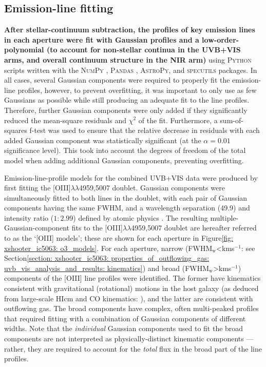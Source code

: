\newpage
\subsection{Emission-line fitting}
\label{section: xshooter_ic_5063: observations_and_data_reduction: emission_line_fitting}

\textbf{After stellar-continuum subtraction, the profiles of key emission lines in each aperture were fit with Gaussian profiles and a low-order-polynomial (to account for non-stellar continua in the UVB+VIS arms, and overall continuum structure in the NIR arm)} using \textsc{Python} scripts written with the \textsc{NumPy} \citep{Harris2020}, \textsc{Pandas} \citep{reback2020pandas}, \textsc{AstroPy}, and \textsc{specutils} packages. In all cases, several Gaussian components were required to properly fit the emission-line profiles, however, to prevent overfitting, it was important to only use as few Gaussians as possible while still producing an adequate fit to the line profiles. Therefore, further Gaussian components were only added if they significantly reduced the mean-square residuals and $\chi^2$ of the fit. Furthermore, a sum-of-squares f-test \citep{Montgomery2012} was used to ensure that the relative decrease in residuals with each added Gaussian component was statistically significant (at the $\alpha=0.01$ significance level). This took into account the degrees of freedom of the total model when adding additional Gaussian components, preventing overfitting.

Emission-line-profile models for the combined UVB+VIS data were produced by first fitting the [OIII]$\lambda\lambda$4959,5007 doublet. Gaussian components were simultaneously fitted to both lines in the doublet, with each pair of Gaussian components having the same FWHM, and a wavelength separation (49.9\;{\AA}) and intensity ratio ($1:2.99$) defined by atomic physics \citep{Osterbrock2006}. The resulting multiple-Gaussian-component fits to the [OIII]$\lambda\lambda$4959,5007 doublet are hereafter referred to as the `[OIII] models'; these are shown for each aperture in Figure\;\ref{fig: xshooter_ic5063: o3_models}. For each aperture, narrow (FWHM$_\mathrm{w}$\;\textless{}\;km\;s$^{-1}$: see Section\;\ref{section: xshooter_ic5063: properties_of_outflowing_gas: uvb_vis_analysis_and_results: kinematics}) and broad (FWHM$_\mathrm{w}$\;\textgreater{}\;km\;s$^{-1}$) components of the [OIII] line profiles were identified. The former have kinematics consistent with gravitational (rotational) motions in the host galaxy (as deduced from large-scale HI\;cm and CO kinematics: \citealt{Morganti1998, Morganti2015}), and the latter are consistent with outflowing gas. The broad components have complex, often multi-peaked profiles that required fitting with a combination of Gaussian components of different widths. Note that the \textit{individual} Gaussian components used to fit the broad components are not interpreted as physically-distinct kinematic components --- rather, they are required to account for the \textit{total} flux in the broad part of the line profiles.

